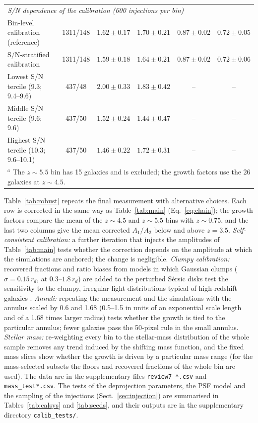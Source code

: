 \documentclass[fleqn,usenatbib]{mnras}
\begin{document}
\begin{table}
\begin{tabular}{lccccc}
\multicolumn{6}{l}{\textit{S/N dependence of the calibration (600 injections per bin)}}\\
Bin-level calibration (reference) & 1311/148 & $1.62\pm0.17$ & $1.70\pm0.21$ & $0.87\pm0.02$ & $0.72\pm0.05$\\
S/N-stratified calibration & 1311/148 & $1.59\pm0.18$ & $1.64\pm0.21$ & $0.87\pm0.02$ & $0.72\pm0.06$\\
Lowest S/N tercile (9.3; 9.4--9.6) & 437/48 & $2.00\pm0.33$ & $1.83\pm0.42$ & -- & --\\
Middle S/N tercile (9.6; 9.6) & 437/50 & $1.52\pm0.24$ & $1.44\pm0.47$ & -- & --\\
Highest S/N tercile (10.3; 9.6--10.1) & 437/50 & $1.46\pm0.22$ & $1.72\pm0.31$ & -- & --\\
\hline
\multicolumn{6}{l}{$^a$ The $z\sim5.5$ bin has 15 galaxies and is excluded; the growth factors use the 26 galaxies at $z\sim4.5$.}\\
\hline
\end{tabular}
\end{table}

Table~\ref{tab:robust} repeats the final measurement with alternative choices.
Each row is corrected in the same way as Table~\ref{tab:main}
(Eq.~\ref{eq:chain}); the growth factors compare the mean of the $z\sim4.5$ and
$z\sim5.5$ bins with $z\sim0.75$, and the last two columns give the mean
corrected $A_1/A_2$ below and above $z=3.5$. \textit{Self-consistent
calibration:} a further iteration that injects the amplitudes of
Table~\ref{tab:main} tests whether the correction depends on the amplitude at
which the simulations are anchored; the change is negligible. \textit{Clumpy
calibration:} recovered fractions and ratio biases from models in which Gaussian
clumps ($\sigma=0.15\,r_d$, at $0.3$--$1.8\,r_d$) are added to the perturbed
S\'ersic disks test the sensitivity to the clumpy, irregular light distributions
typical of high-redshift galaxies \citep{Ferreira2022,Kartaltepe2023}.
\textit{Annuli:} repeating the measurement and the simulations with the annulus
scaled by 0.6 and 1.68 (0.5--1.5 in units of an exponential scale length and of a
1.68 times larger radius) tests whether the growth is tied to the particular
annulus; fewer galaxies pass the 50-pixel rule in the small annulus.
\textit{Stellar mass:} re-weighting every bin to the stellar-mass distribution of
the whole sample removes any trend induced by the shifting mass function, and the
fixed mass slices show whether the growth is driven by a particular mass range
(for the mass-selected subsets the floors and recovered fractions of the whole
bin are used). The data are in the supplementary files \texttt{review7\_*.csv}
and \texttt{mass\_test*.csv}. The tests of the deprojection parameters, the PSF
model and the sampling of the injections (Sect.~\ref{sec:injection}) are
summarised in Tables~\ref{tab:calsys} and \ref{tab:seeds}, and their outputs are
in the supplementary directory \texttt{calib\_tests/}.
\end{document}
